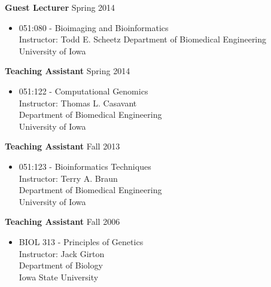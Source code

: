 \documentclass[11pt]{article}
\newenvironment{innerlist}[1][\enskip\textbullet]%
        {\begin{itemize}[#1,leftmargin=*,parsep=0pt,itemsep=0pt,topsep=0pt,partopsep=0pt]}
        {\end{itemize}}
\newcommand{\halfblankline}{\quad\vspace{-0.5\baselineskip}\pagebreak[3]}
\begin{document}
\halfblankline

\textbf{Guest Lecturer} \hfill {Spring 2014}
\begin{innerlist}

\item[] 051:080 - Bioimaging and Bioinformatics\\
	Instructor: Todd E. Scheetz
	Department of Biomedical Engineering\\
	University of Iowa
\end{innerlist}

\halfblankline

\textbf{Teaching Assistant} \hfill {Spring 2014}
\begin{innerlist}

\item[] 051:122 - Computational Genomics\\
	Instructor: Thomas L. Casavant\\
	Department of Biomedical Engineering\\
	University of Iowa
\end{innerlist}

\halfblankline

\begin{samepage}
\textbf{Teaching Assistant} \hfill {Fall 2013}
\begin{innerlist}

\item[] 051:123 - Bioinformatics Techniques\\
        Instructor: Terry A. Braun\\
        Department of Biomedical Engineering\\
        University of Iowa
\end{innerlist}
\end{samepage}

\halfblankline

\begin{samepage}
\textbf{Teaching Assistant} \hfill {Fall 2006}
\begin{innerlist}

\item[] BIOL 313 - Principles of Genetics\\
	Instructor: Jack Girton\\
	Department of Biology\\
	Iowa State University
\end{innerlist}
\end{samepage}
\end{document}

